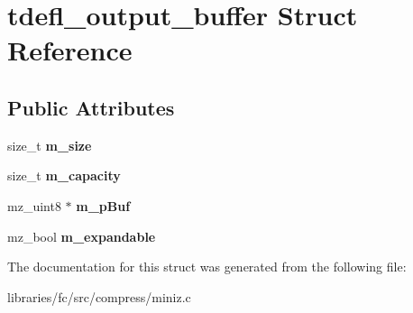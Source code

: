 \hypertarget{structtdefl__output__buffer}{}\section{tdefl\+\_\+output\+\_\+buffer Struct Reference}
\label{structtdefl__output__buffer}
\subsection*{Public Attributes}
\begin{DoxyCompactItemize}
\item 
\mbox{\label{structtdefl__output__buffer_ab506aa434be983761db4cca43d2ebc9e}} 
size\+\_\+t {\bfseries m\+\_\+size}
\item 
\mbox{\label{structtdefl__output__buffer_ab0705ebff551ebede28640ada5a9d2ab}} 
size\+\_\+t {\bfseries m\+\_\+capacity}
\item 
\mbox{\label{structtdefl__output__buffer_a60119e1ddcb4fb92149189bed7cb8250}} 
mz\+\_\+uint8 $\ast$ {\bfseries m\+\_\+p\+Buf}
\item 
\mbox{\label{structtdefl__output__buffer_a26e5da3f933edc1a218afbe7838e9d22}} 
mz\+\_\+bool {\bfseries m\+\_\+expandable}
\end{DoxyCompactItemize}


The documentation for this struct was generated from the following file\+:\begin{DoxyCompactItemize}
\item 
libraries/fc/src/compress/miniz.\+c\end{DoxyCompactItemize}
